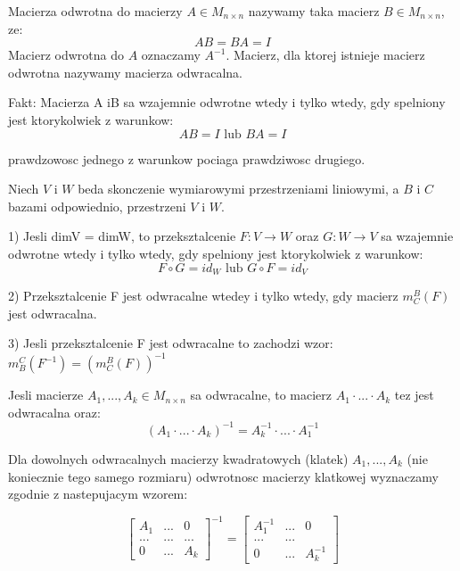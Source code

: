 \documentclass{article}
\begin{document}
\begin{tcolorbox}[colback=white!90!red,colframe=black!35!red,title=Macierz i przeksztalcenie odwrotne]

Macierza odwrotna do macierzy $A \in M_{n \times n}$ nazywamy taka macierz $B \in M_{n \times n}$, ze:
$$AB = BA = I$$
Macierz odwrotna do $A$ oznaczamy $A^{-1}$. Macierz, dla ktorej istnieje macierz odwrotna nazywamy macierza odwracalna.

Fakt: Macierza A iB sa wzajemnie odwrotne wtedy i tylko wtedy, gdy spelniony jest ktorykolwiek z warunkow:
$$AB = I \text{ lub } BA = I$$

prawdzowosc jednego z warunkow pociaga prawdziwosc drugiego.



Niech $V$ i $W$ beda skonczenie wymiarowymi przestrzeniami liniowymi, a $B$ i $C$ bazami odpowiednio, przestrzeni $V$ i $W$.

1) Jesli dimV = dimW, to przeksztalcenie $F: V \rightarrow W$ oraz $G:W \rightarrow V$ sa wzajemnie odwrotne wtedy i tylko wtedy, gdy spelniony jest ktorykolwiek z warunkow:
$$F \circ G = id_{W} \text{ lub } G \circ F = id_{V}$$

2) Przeksztalcenie F jest odwracalne wtedey i tylko wtedy, gdy macierz $m_{C}^{B}(F)$ jest odwracalna.

3) Jesli przeksztalcenie F jest odwracalne to zachodzi wzor: $m_{B}^{C}(F^{-1}) = (m_{C}^{B}(F))^{-1}$

\end{tcolorbox}

\begin{tcolorbox}[colback=white!90!red,colframe=black!35!red,title=Fakt 2.25-2.26 Odwrotnosc iloczynu macierzy i Odwrotnosc macierzy klatkowej]

Jesli macierze $A_{1},..., A_{k} \in M_{n \times n}$ sa odwracalne, to macierz $A_{1} \cdot ... \cdot A_{k}$ tez jest odwracalna oraz:
$$(A_{1} \cdot ... \cdot A_{k})^{-1} = A_{k}^{-1} \cdot ... \cdot A_{1}^{-1}$$


Dla dowolnych odwracalnych macierzy kwadratowych (klatek) $A_{1}, ... , A_{k}$ (nie koniecznie tego samego rozmiaru) odwrotnosc macierzy klatkowej wyznaczamy zgodnie z nastepujacym wzorem:

$${\begin{bmatrix}
A_{1} & ... & 0 \\
... & ... & ... \\
0 & ... & A_{k}
\end{bmatrix}}^{-1} = 
\begin{bmatrix}
A_{1}^{-1} & ... & 0 \\
... & ... & \\
0 & ... & A_{k}^{-1}
\end{bmatrix} $$

\end{tcolorbox}
\end{document}
